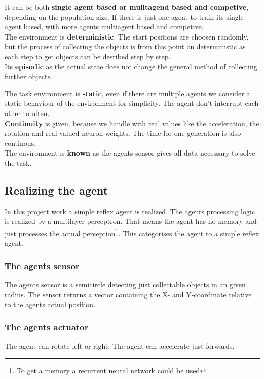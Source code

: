 \documentclass[10pt,a4paper,DIV=11]{scrreprt}
\begin{document}
It can be both \textbf{single agent based or mulitagend based and competive}, depending on the population size. If there is just one agent to train its single agent based, with more agents multiagent based and competive. \\

The environment is \textbf{deterministic}. The start positions are choosen randomly, but the process of collecting the objects is from this point on deterministic as each step to get objects can be desribed step by step. \\

Its \textbf{episodic} as the actual state does not change the general method of collecting further objects.

The task environment is \textbf{static}, even if there are multiple agents we consider a static behaviour of the environment for simplicity. The agent don't interrupt each other to often. \\

\textbf{Continuity} is given, because we handle with real values like the acceleration, the rotation and real valued neuron weights. The time for one generation is also continous. \\

The environment is \textbf{known} as the agents sensor gives all data necessary to solve the task.\\

\subsection{Realizing the agent}
In this project work a simple reflex agent is realized.
The agents processing logic is realized by a multilayer perceptron. That means the agent has no memory and just processes the actual perception\footnote{To get a memory a recurrent neural network could be used}. This categorises the agent to a simple reflex agent.

\subsubsection*{The agents sensor}
The agents sensor is a semicircle detecting just collectable objects in an given radius. The sensor returns a vector containing the X- and Y-coordinate relative to the agents actual position.

\subsubsection*{The agents actuator}
The agent can rotate left or right.
The agent can accelerate just forwards.
\end{document}
